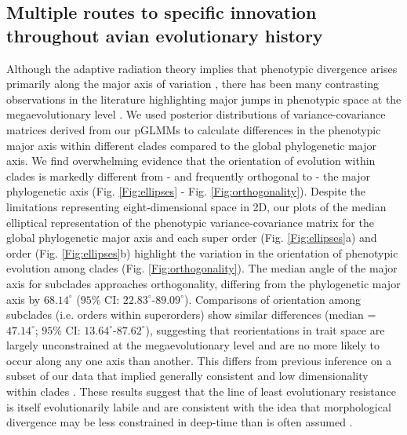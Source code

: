 \documentclass[12pt,letterpaper]{article}
\begin{document}
\subsection{Multiple routes to specific innovation throughout avian evolutionary history}
Although the adaptive radiation theory implies that phenotypic divergence arises primarily along the major axis of variation \cite{marroig2005size}, there has been many contrasting observations in the literature highlighting major jumps in phenotypic space at the megaevolutionary level \cite{puttick2014high,cooney2017mega,venditti2011multiple}.
We used posterior distributions of variance-covariance matrices derived from our pGLMMs to calculate differences in the phenotypic major axis within different clades compared to the global phylogenetic major axis.
We find overwhelming evidence that the orientation of evolution within clades is markedly different from - and frequently orthogonal to - the major phylogenetic axis (Fig. \ref{Fig:ellipses} - Fig. \ref{Fig:orthogonality}).
Despite the limitations representing eight-dimensional space in 2D, our plots of the median elliptical representation of the phenotypic variance-covariance matrix for the global phylogenetic major axis and each super order (Fig. \ref{Fig:ellipses}a) and order (Fig. \ref{Fig:ellipses}b) highlight the variation in the orientation of phenotypic evolution among clades (Fig. \ref{Fig:orthogonality}).
The median angle of the major axis for subclades approaches orthogonality, differing from the phylogenetic major axis by $68.14^\circ$ ($95$\% CI: $22.83^\circ$-$89.09^\circ$).
Comparisons of orientation among subclades (i.e. orders within superorders) show similar differences (median = $47.14^\circ$; $95$\% CI: $13.64^\circ$-$87.62^\circ$), suggesting that reorientations in trait space are largely unconstrained at the megaevolutionary level and are no more likely to occur along any one axis than another.
This differs from previous inference on a subset of our data that implied generally consistent and low dimensionality within clades \cite{cooney2017mega}.
These results suggest that the line of least evolutionary resistance is itself evolutionarily labile and are consistent with the idea that morphological divergence may be less constrained in deep-time than is often assumed \cite{venditti2011multiple}.
\end{document}
